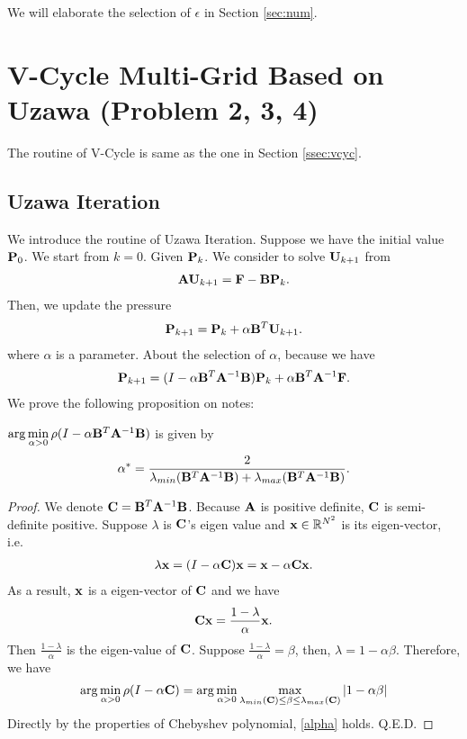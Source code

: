 \documentclass[english]{pkupaper}
\newenvironment{eqt}{\begin{equation}\begin{aligned}}{\end{aligned}\end{equation}}
\begin{document}
We will elaborate the selection of $\epsilon$ in Section \ref{sec:num}.

\section{V-Cycle Multi-Grid Based on Uzawa (Problem 2, 3, 4)}
\label{sec:prob2}
The routine of V-Cycle is same as the one in Section \ref{ssec:vcyc}.
\subsection{Uzawa Iteration}
We introduce the routine of Uzawa Iteration. Suppose we have the initial value $\mathbf{P}_0$. We start from $k=0$. Given $\mathbf{P}_k$. We consider to solve $\mathbf{U}_{k+1}$ from 
\begin{eqt}
\label{aufbp}
\mfA\mfU_{k+1}=\mfF-\mfB\mfP_k.
\end{eqt}
Then, we update the pressure
\begin{eqt}
\mfP_{k+1}=\mfP_k+\alpha \mfB^T\mfU_{k+1}.
\end{eqt}
where $\alpha$ is a parameter. About the selection of $\alpha$, because we have
\begin{eqt}
\mfP_{k+1}=(I-\alpha \mfB^T\mfA^{-1}\mfB)\mfP_k+\alpha\mfB^T\mfA^{-1}\mfF.
\end{eqt}
We prove the following proposition on notes:
\begin{proposition}
$\arg\min\limits_{\alpha>0} \rho(I-\alpha \mathbf{B}^T\mathbf{A}^{-1}\mathbf{B})$ is given by 
\begin{eqt}
\label{alpha}
\alpha^*=\frac{2}{\lambda_{min}(\mfB^T\mfA^{-1}\mfB)+\lambda_{max}(\mfB^T\mfA^{-1}\mfB)}.
\end{eqt}
\end{proposition}
\begin{proof}
We denote $\mathbf{C} =  \mathbf{B}^T\mathbf{A}^{-1}\mathbf{B}$. Because $\mathbf{A}$ is positive definite, $\mathbf{C}$ is semi-definite positive. Suppose $\lambda$ is $\mathbf{C}$'s eigen value and $\mathbf{x}\in\mathbb{R}^{N^2}$ is its eigen-vector, i.e.
\begin{eqt}
\lambda\mfx = (I-\alpha\mfC)\mfx = \mfx-\alpha\mfC\mfx.
\end{eqt}
As a result, $\mathbf{x}$ is a eigen-vector of $\mathbf{C}$ and we have
\begin{eqt}
\mfC\mfx=\frac{1-\lambda}{\alpha}\mfx.
\end{eqt}
Then $\frac{1-\lambda}{\alpha}$ is the eigen-value of $\mathbf{C}$.  Suppose $\frac{1-\lambda}{\alpha}=\beta$, then, $\lambda = 1-\alpha\beta$. Therefore, we have
\begin{eqt}
\arg\min\limits_{\alpha>0} \rho(I-\alpha\mfC) = \arg\min\limits_{\alpha>0} \max\limits_{\lambda_{min}(\mfC)\leq\beta\leq\lambda_{max}(\mfC)}|1-\alpha\beta|
\end{eqt}
Directly by the properties of Chebyshev polynomial, \ref{alpha} holds. Q.E.D.
\end{proof}
\end{document}
